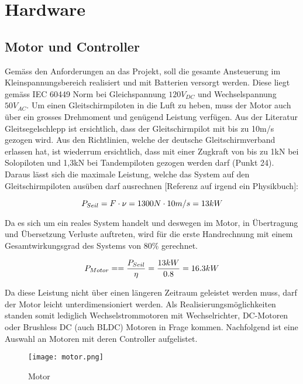 \section{Hardware}

\subsection{Motor und Controller}\label{subsec:MotorController}
Gemäss den Anforderungen an das Projekt, soll die gesamte Ansteuerung im Kleinspannungsbereich realisiert und mit Batterien versorgt werden. Diese liegt gemäss IEC 60449 Norm bei Gleichspannung $120V_{DC}$ und Wechselspannung $50V_{AC}$. Um einen Gleitschirmpiloten in die Luft zu heben, muss der Motor auch über ein grosses Drehmoment und genügend Leistung verfügen. Aus der Literatur Gleitsegelschlepp \cite{Gleitsegelschlepp} ist ersichtlich, dass der Gleitschirmpilot mit bis zu 10m/s gezogen wird. Aus den Richtlinien, welche der deutsche Gleitschirmverband erlassen hat, ist wiederrum ersichtlich, dass mit einer Zugkraft von bis zu 1kN bei Solopiloten und 1,3kN bei Tandempiloten gezogen werden darf \cite{WindenProtokoll} (Punkt 24). Daraus lässt sich die maximale Leistung, welche das System auf den Gleitschirmpiloten ausüben darf ausrechnen [Referenz auf irgend ein Physikbuch]:


\begin{equation}
\centering
P_{Seil}=F \cdot \nu=1300N \cdot 10m/s=13kW
\label{eq:LeistungSeil}
\end{equation}

Da es sich um ein reales System handelt und deswegen im Motor, in Übertragung und Übersetzung Verluste auftreten, wird für die erste Handrechnung mit einem Gesamtwirkungsgrad des Systems von 80$\%$ gerechnet.

\begin{equation}
\centering
P_{Motor}==\frac{P_{Seil}}{\eta}=\frac{13kW}{0.8}=16.3kW
\label{eq:LeistungMotor}
\end{equation}

Da diese Leistung nicht über einen längeren Zeitraum geleistet werden muss, darf der Motor leicht unterdimensioniert werden. Als Realisierungsmöglichkeiten standen somit lediglich Wechselstrommotoren mit Wechselrichter, DC-Motoren oder Brushless DC (auch BLDC) Motoren in Frage kommen. Nachfolgend ist eine Auswahl an Motoren mit deren Controller aufgelistet.

\begin{figure}[H]
	\begin{center}
		\texttt{[image: motor.png]}
		\caption[Motorenvergleich]{Motor} %
		\label{fig:Funktion Dojo}
	\end{center}
\end{figure}

